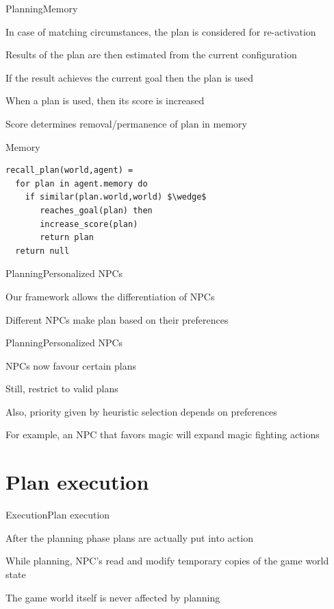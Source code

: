 \documentclass{beamer}
\begin{document}
\begin{slide}{Planning}{Memory}{
\item In case of matching circumstances, the plan is considered for re-activation
\item Results of the plan are then estimated from the current configuration
\item If the result achieves the current goal then the plan is used
\item When a plan is used, then its score is increased
\item Score determines removal/permanence of plan in memory
}\end{slide}

\begin{frame}[fragile]{Memory}
\begin{lstlisting}
recall_plan(world,agent) =
  for plan in agent.memory do
    if similar(plan.world,world) $\wedge$
       reaches_goal(plan) then
       increase_score(plan)
       return plan
  return null
\end{lstlisting}
\end{frame}

\begin{slide}{Planning}{Personalized NPCs}{
\item Our framework allows the differentiation of NPCs
\item Different NPCs make plan based on their preferences
}\end{slide}

\begin{slide}{Planning}{Personalized NPCs}{
\item NPCs now favour certain plans
\item Still, restrict to valid plans
\item Also, priority given by heuristic selection depends on preferences
\item For example, an NPC that favors magic will expand magic fighting actions
}\end{slide}

\section{Plan execution}
\begin{slide}{Execution}{Plan execution}{
\item After the planning phase plans are actually put into action
\item While planning, NPC's read and modify temporary copies of the game world state
\item The game world itself is never affected by planning
}\end{slide}
\end{document}
